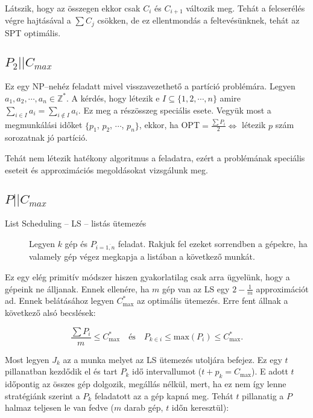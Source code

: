Látszik, hogy az összegen ekkor csak $C_i$ és $C_{i+1}$ változik meg. Tehát a
felcserélés végre hajtásával a $\sum C_j$ csökken, de ez ellentmondás a
feltevésünknek, tehát az SPT optimális.

\subsection{ \texorpdfstring {$ P_2||C_{max}$} {P2||Cmax} }

Ez egy NP--nehéz feladatt mivel visszavezethető a partíció problémára. Legyen
$a_1, a_2, \cdots, a_n \in \mathbb{Z}^*$. A kérdés, hogy létezik e $I \subseteq
	\{1,2, \cdots, n \}$ amire $\sum_{i \in I} a_i = \sum_{i \not \in I} a_i$. Ez
meg a részösszeg speciális esete. Vegyük most a megmunkálási időket $\{p_1$, $p_2$,
$\cdots$, $p_n\}$, ekkor, ha OPT$=\frac{\sum P_i}{2} \Leftrightarrow$ létezik $p$
szám sorozatnak jó partíció.

Tehát nem létezik hatékony algoritmus a feladatra, ezért a problémának speciális
eseteit és approximációs megoldásokat vizsgálunk meg.

\subsection{ \texorpdfstring {$ P||C_{max}$} {P||Cmax} }

\begin{description}
	\item[List Scheduling -- LS -- listás ütemezés] Legyen $k$ gép és
	      $P_{i=\overline{1,n}}$ feladat. Rakjuk fel ezeket sorrendben a gépekre, ha
	      valamely gép végez megkapja a listában a következő munkát.
\end{description}

Ez egy elég primitív módszer hiszen gyakorlatilag csak arra ügyelünk, hogy a
gépeink ne álljanak. Ennek ellenére, ha $m$ gép van  az LS egy $2 - \frac{1}{m}$
approximációt ad. Ennek belátásához legyen $C^*_{\mbox{max}}$ az optimális
ütemezés. Erre fent állnak a következő alsó becslések:

\[ \frac{\sum P_i}{m} \leq C^*_{\mbox{max}} ~~~\mbox{ és }~~~
	P_{k \in i} \leq \mbox{max} (P_i) \leq C^*_{\mbox{max}}.
\]

Most legyen $J_k$ az a munka melyet az LS ütemezés utoljára befejez. Ez egy $t$
pillanatban kezdődik el és tart $P_k$ idő intervallumot ($t+p_k=C_{\mbox{max}}$).
E adott $t$ időpontig az összes gép dolgozik, megállás nélkül, mert, ha ez nem
így lenne stratégiánk szerint a $P_k$ feladatott az a gép kapná meg. Tehát $t$
pillanatig a $P$ halmaz teljesen le van fedve ($m$ darab gép, $t$ időn
keresztül):

